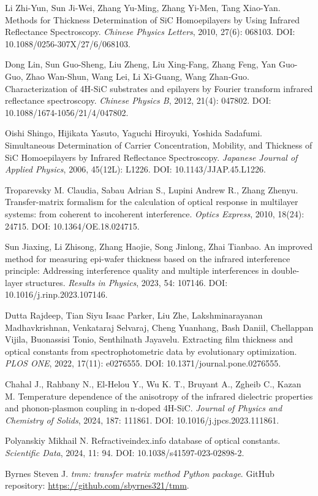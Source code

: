 \documentclass[UTF8,a4paper,12pt]{ctexart}
\begin{document}
\begin{enumerate}[label={[\arabic*]}]
  \item Li Zhi-Yun, Sun Ji-Wei, Zhang Yu-Ming, Zhang Yi-Men, Tang Xiao-Yan. Methods for Thickness Determination of SiC Homoepilayers by Using Infrared Reflectance Spectroscopy. \textit{Chinese Physics Letters}, 2010, 27(6): 068103. DOI: 10.1088/0256-307X/27/6/068103.
  \item Dong Lin, Sun Guo-Sheng, Liu Zheng, Liu Xing-Fang, Zhang Feng, Yan Guo-Guo, Zhao Wan-Shun, Wang Lei, Li Xi-Guang, Wang Zhan-Guo. Characterization of 4H-SiC substrates and epilayers by Fourier transform infrared reflectance spectroscopy. \textit{Chinese Physics B}, 2012, 21(4): 047802. DOI: 10.1088/1674-1056/21/4/047802.
  \item Oishi Shingo, Hijikata Yasuto, Yaguchi Hiroyuki, Yoshida Sadafumi. Simultaneous Determination of Carrier Concentration, Mobility, and Thickness of SiC Homoepilayers by Infrared Reflectance Spectroscopy. \textit{Japanese Journal of Applied Physics}, 2006, 45(12L): L1226. DOI: 10.1143/JJAP.45.L1226.
  \item Troparevsky M. Claudia, Sabau Adrian S., Lupini Andrew R., Zhang Zhenyu. Transfer-matrix formalism for the calculation of optical response in multilayer systems: from coherent to incoherent interference. \textit{Optics Express}, 2010, 18(24): 24715. DOI: 10.1364/OE.18.024715.
  \item Sun Jiaxing, Li Zhisong, Zhang Haojie, Song Jinlong, Zhai Tianbao. An improved method for measuring epi-wafer thickness based on the infrared interference principle: Addressing interference quality and multiple interferences in double-layer structures. \textit{Results in Physics}, 2023, 54: 107146. DOI: 10.1016/j.rinp.2023.107146.
  \item Dutta Rajdeep, Tian Siyu Isaac Parker, Liu Zhe, Lakshminarayanan Madhavkrishnan, Venkataraj Selvaraj, Cheng Yuanhang, Bash Daniil, Chellappan Vijila, Buonassisi Tonio, Senthilnath Jayavelu. Extracting film thickness and optical constants from spectrophotometric data by evolutionary optimization. \textit{PLOS ONE}, 2022, 17(11): e0276555. DOI: 10.1371/journal.pone.0276555.
  \item Chahal J., Rahbany N., El-Helou Y., Wu K. T., Bruyant A., Zgheib C., Kazan M. Temperature dependence of the anisotropy of the infrared dielectric properties and phonon-plasmon coupling in n-doped 4H-SiC. \textit{Journal of Physics and Chemistry of Solids}, 2024, 187: 111861. DOI: 10.1016/j.jpcs.2023.111861.
  \item Polyanskiy Mikhail N. Refractiveindex.info database of optical constants. \textit{Scientific Data}, 2024, 11: 94. DOI: 10.1038/s41597-023-02898-2.
  \item Byrnes Steven J. \textit{tmm: transfer matrix method Python package}. GitHub repository: \url{https://github.com/sbyrnes321/tmm}.
\end{enumerate}
\end{document}
